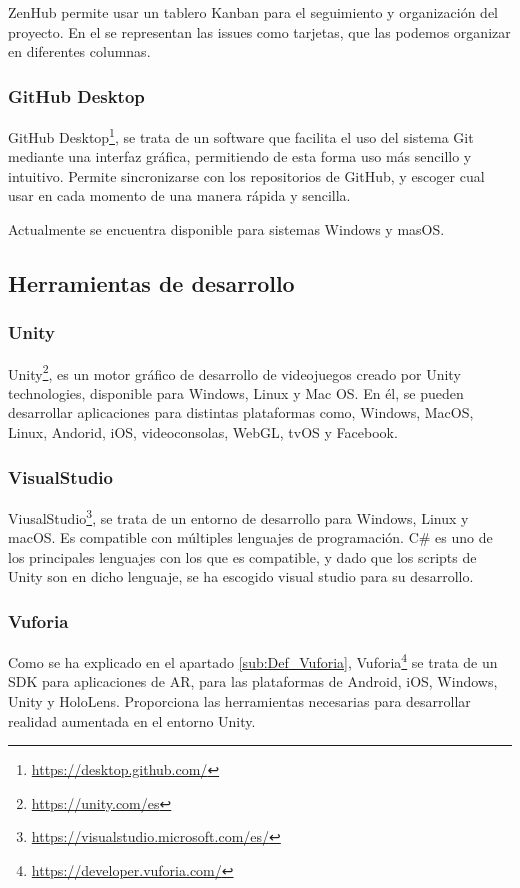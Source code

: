 ZenHub permite usar un tablero Kanban para el seguimiento y organización del proyecto. En el se representan las issues como tarjetas, que las podemos organizar en diferentes columnas.


\subsubsection{GitHub Desktop}
 GitHub Desktop\footnote{\url{https://desktop.github.com/}}, se trata de un software  que facilita el uso del sistema Git mediante una interfaz gráfica, permitiendo de esta forma uso más sencillo y intuitivo. Permite sincronizarse con los repositorios de GitHub, y escoger cual usar en cada momento de una manera  rápida y sencilla.
 
 
 Actualmente se encuentra disponible para sistemas Windows y masOS.

\subsection{Herramientas de desarrollo}

\subsubsection{Unity}
Unity\footnote{\url{https://unity.com/es}}, es un motor gráfico de desarrollo de videojuegos creado por Unity technologies, disponible para Windows, Linux y Mac OS. En él, se pueden desarrollar aplicaciones para distintas plataformas como, Windows, MacOS, Linux, Andorid, iOS, videoconsolas, WebGL, tvOS y Facebook.

\subsubsection{VisualStudio}
ViusalStudio\footnote{\url{https://visualstudio.microsoft.com/es/}}, se trata de un entorno de desarrollo para Windows, Linux y macOS. Es compatible con múltiples lenguajes de programación. C\# es uno de los principales lenguajes con los que es compatible, y dado que los scripts de Unity son en dicho lenguaje, se ha escogido visual studio para su desarrollo.


\subsubsection{Vuforia}
Como se ha explicado en el apartado \ref{sub:Def_Vuforia}, Vuforia\footnote{\url{https://developer.vuforia.com/}} se trata de un SDK para aplicaciones de AR, para las plataformas de Android, iOS, Windows, Unity y HoloLens. Proporciona las herramientas necesarias para desarrollar realidad aumentada en el entorno Unity.

